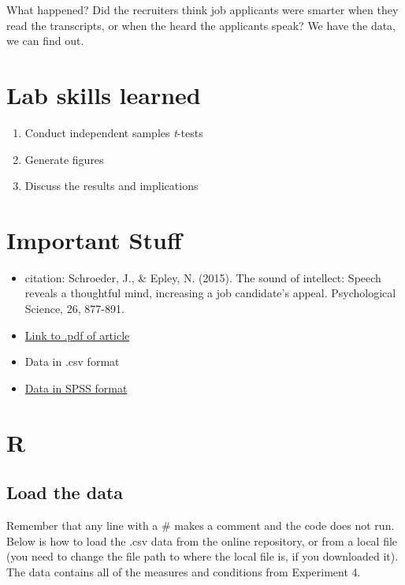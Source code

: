 \documentclass[
]{book}
\providecommand{\tightlist}{%
  \setlength{\itemsep}{0pt}\setlength{\parskip}{0pt}}
\begin{document}
What happened? Did the recruiters think job applicants were smarter when they read the transcripts, or when the heard the applicants speak? We have the data, we can find out.

\hypertarget{lab-skills-learned-1}{%
\section{Lab skills learned}\label{lab-skills-learned-1}}

\begin{enumerate}
\def\labelenumi{\arabic{enumi}.}
\tightlist
\item
  Conduct independent samples \emph{t}-tests
\item
  Generate figures
\item
  Discuss the results and implications
\end{enumerate}

\hypertarget{important-stuff-1}{%
\section{Important Stuff}\label{important-stuff-1}}

\begin{itemize}
\tightlist
\item
  citation: Schroeder, J., \& Epley, N. (2015). The sound of intellect: Speech reveals a thoughtful mind, increasing a job candidate's appeal. Psychological Science, 26, 877-891.
\item
  \href{http://journals.sagepub.com/stoken/default+domain/PhtK6MPtXvkgnYRrnGbA/full}{Link to .pdf of article}
\item
  Data in .csv format
\item
  \href{https://drive.google.com/open?id=0Bz-rhZ21ShvOVXlDMjEzQU1oY1k}{Data in SPSS format}
\end{itemize}

\hypertarget{r-5}{%
\section{R}\label{r-5}}

\hypertarget{load-the-data}{%
\subsection{Load the data}\label{load-the-data}}

Remember that any line with a \# makes a comment and the code does not run. Below is how to load the .csv data from the online repository, or from a local file (you need to change the file path to where the local file is, if you downloaded it). The data contains all of the measures and conditions from Experiment 4.
\end{document}

